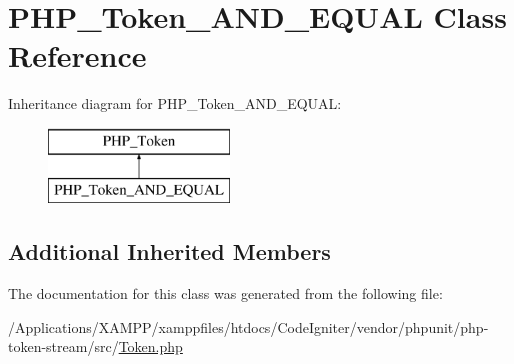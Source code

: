 \hypertarget{class_p_h_p___token___a_n_d___e_q_u_a_l}{}\section{P\+H\+P\+\_\+\+Token\+\_\+\+A\+N\+D\+\_\+\+E\+Q\+U\+AL Class Reference}
\label{class_p_h_p___token___a_n_d___e_q_u_a_l}
Inheritance diagram for P\+H\+P\+\_\+\+Token\+\_\+\+A\+N\+D\+\_\+\+E\+Q\+U\+AL\+:\begin{figure}[H]
\begin{center}
\leavevmode
\includegraphics[height=2.000000cm]{class_p_h_p___token___a_n_d___e_q_u_a_l}
\end{center}
\end{figure}
\subsection*{Additional Inherited Members}


The documentation for this class was generated from the following file\+:\begin{DoxyCompactItemize}
\item 
/\+Applications/\+X\+A\+M\+P\+P/xamppfiles/htdocs/\+Code\+Igniter/vendor/phpunit/php-\/token-\/stream/src/\mbox{\hyperlink{_token_8php}{Token.\+php}}\end{DoxyCompactItemize}
